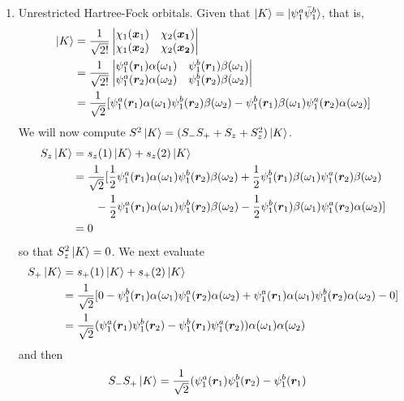 \begin{enumerate}
\item\label{c2p41} Unrestricted Hartree-Fock orbitals.
Given that $\ket{K} = \ket{\psi_1^a\bar{\psi}_1^b}$, that is,
\[
\begin{aligned}
\ket{K} &= \frac{1}{\sqrt{2!}}\begin{vmatrix}
\chi_1(\bm{x}_1) & \chi_2(\bm{x_1}) \\
\chi_1(\bm{x}_2) & \chi_2(\bm{x_2})
\end{vmatrix} \\
&=\frac{1}{\sqrt{2!}}\begin{vmatrix}
\psi_1^a(\bm{r}_1)\alpha(\omega_1) & \psi_1^b(\bm{r}_1)\beta(\omega_1) \\
\psi_1^a(\bm{r}_2)\alpha(\omega_2) & \psi_1^b(\bm{r}_2)\beta(\omega_2)
\end{vmatrix} \\
&= \frac{1}{\sqrt{2}}[\psi_1^a(\bm{r}_1)\alpha(\omega_1)\psi_1^b(\bm{r}_2)
\beta(\omega_2) - \psi_1^b(\bm{r}_1)\beta(\omega_1)\psi_1^a(\bm{r}_2)
\alpha(\omega_2)]
\end{aligned}
\]
We will now compute $S^2\ket{K} = (S_-S_+ + S_z + S_z^2)\ket{K}$.
\[
\begin{aligned}
S_z\ket{K} &= s_z(1)\ket{K} + s_z(2)\ket{K} \\
 &= \frac{1}{\sqrt{2}}[\frac{1}{2}\psi_1^a(\bm{r}_1)\alpha(\omega_1)
 \psi_1^b(\bm{r}_2)\beta(\omega_2) + \frac{1}{2}\psi_1^b(\bm{r}_1)
 \beta(\omega_1)\psi_1^a(\bm{r}_2)\beta(\omega_2) \\
 &\quad\quad-\frac{1}{2}\psi_1^a(\bm{r}_1)\alpha(\omega_1)\psi_1^b(\bm{r}_2)
 \beta(\omega_2) - \frac{1}{2}\psi_1^b(\bm{r}_1)\beta(\omega_1)
 \psi_1^a(\bm{r}_2)\alpha(\omega_2)] \\
 &= 0
\end{aligned}
\]
so that $S_z^2\ket{K} = 0$. We next evaluate
\[
\begin{aligned}
S_+\ket{K} &= s_+(1)\ket{K} + s_+(2)\ket{K} \\
&= \frac{1}{\sqrt{2}}[0 - \psi_1^b(\bm{r}_1)\alpha(\omega_1)\psi_1^a(\bm{r}_2)
\alpha(\omega_2) + 
   \psi_1^a(\bm{r}_1)\alpha(\omega_1)\psi_1^b(\bm{r}_2)\alpha(\omega_2) - 0] \\
&= \frac{1}{\sqrt{2}}(\psi_1^a(\bm{r}_1)\psi_1^b(\bm{r}_2) - \psi_1^b(\bm{r}_1)
\psi_1^a(\bm{r}_2))\alpha(\omega_1)\alpha(\omega_2)
\end{aligned}
\]
and then
\[
\begin{aligned}
S_-S_+\ket{K} 
&= \frac{1}{\sqrt{2}}(\psi_1^a(\vec{r}_1)\psi_1^b(\vec{r}_2) - \psi_1^b(\vec{r}_1)

\end{aligned}\]
\end{enumerate}
